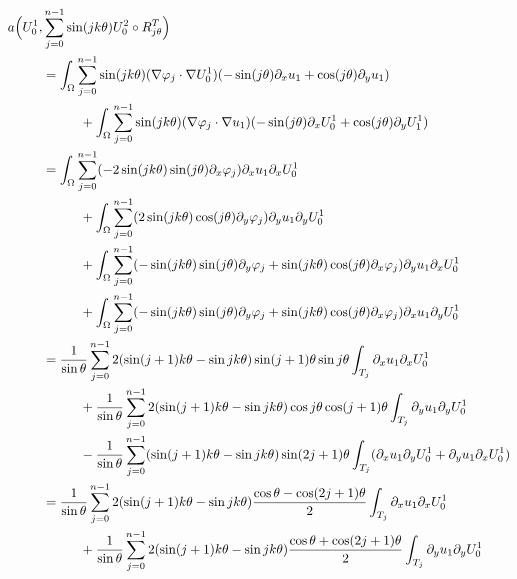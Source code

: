 \documentclass[JEP,XML,SOM,Unicode,ThmDefs,NoFloatCountersInSection,published]{cedram}
\theoremstyle{plain}
\theoremstyle{definition}
\begin{document}
\vspace*{-1\baselineskip}
\bgroup\smaller
\begin{align*}
a\Bigl(U_0^1,&\sum_{j=0}^{n-1} \sin(jk\theta) U_0^2 \circ R_{j\theta}^T\Bigr)\\
&= \int_\Omega \sum_{j=0}^{n-1} \sin(jk\theta)(\nabla \varphi_j\cdot \nabla U_0^1)(-\sin(j\theta) \partial_x u_1+\cos (j\theta)\partial_y u_1) \\
&\hspace*{1cm}+ \int_\Omega \sum_{j=0}^{n-1}\sin(jk\theta) (\nabla \varphi_j\cdot \nabla u_1)(-\sin(j\theta) \partial_x U_0^1 +\cos(j\theta) \partial_y U_1^1) \\
&= \int_\Omega \sum_{j=0}^{n-1} (-2 \sin(jk\theta)\sin(j\theta)\partial_x \varphi_j) \partial_x u_1 \partial_x U_0^1 \\
&\hspace*{1cm}+ \int_\Omega \sum_{j=0}^{n-1}(2\sin(jk\theta)\cos(j\theta)\partial_y \varphi_j) \partial_y u_1 \partial_y U_0^1 \\
&\hspace*{1cm}+ \int_\Omega \sum_{j=0}^{n-1} (-\sin(jk\theta)\sin(j\theta)\partial_y \varphi_j+\sin(jk\theta)\cos(j\theta)\partial_x \varphi_j) \partial_y u_1 \partial_x U_0^1 \\
&\hspace*{1cm}+ \int_\Omega \sum_{j=0}^{n-1} (-\sin(jk\theta)\sin(j\theta)\partial_y \varphi_j+\sin(jk\theta)\cos(j\theta)\partial_x \varphi_j) \partial_x u_1 \partial_y U_0^1\\
&=\frac{1}{\sin \theta}\sum_{j=0}^{n-1}2 (\sin(j+1)k\theta-\sin jk\theta)\sin(j+1)\theta\sin j\theta \int_{T_j} \partial_x u_1 \partial_x U_0^1\\
&\hspace*{1cm}+\frac{1}{\sin \theta}\sum_{j=0}^{n-1} 2(\sin(j+1)k\theta-\sin jk\theta)\cos j \theta\cos (j+1)\theta \int_{T_j} \partial_y u_1 \partial_y U_0^1\\
&\hspace*{1cm}-\frac{1}{\sin \theta}\sum_{j=0}^{n-1} (\sin(j+1)k\theta-\sin jk\theta)\sin(2j+1)\theta
\int_{T_j} (\partial_x u_1 \partial_y U_0^1 + \partial_y u_1 \partial_x U_0^1)\\
&=\frac{1}{\sin \theta}\sum_{j=0}^{n-1}2 (\sin(j+1)k\theta-\sin jk\theta)\frac{\cos\theta-\cos (2j+1) \theta}{2}
\int_{T_j} \partial_x u_1 \partial_x U_0^1\\
&\hspace*{1cm}+\frac{1}{\sin \theta}\sum_{j=0}^{n-1} 2(\sin(j+1)k\theta-\sin jk\theta)\frac{\cos\theta+\cos (2j+1) \theta}{2} \int_{T_j} \partial_y u_1 \partial_y U_0^1\\

\end{align*}
\end{document}
